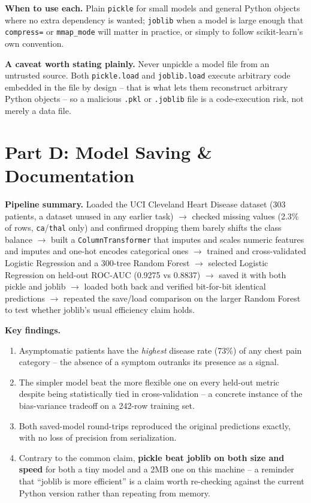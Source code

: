 \documentclass[11pt,a4paper]{article}
\begin{document}
\textbf{When to use each.} Plain \texttt{pickle} for small models and general Python
objects where no extra dependency is wanted; \texttt{joblib} when a model is large
enough that \texttt{compress=} or \texttt{mmap\_mode} will matter in practice, or simply
to follow scikit-learn's own convention.

\textbf{A caveat worth stating plainly.} Never unpickle a model file from an untrusted
source. Both \texttt{pickle.load} and \texttt{joblib.load} execute arbitrary code
embedded in the file by design -- that is what lets them reconstruct arbitrary Python
objects -- so a malicious \texttt{.pkl} or \texttt{.joblib} file is a code-execution
risk, not merely a data file.

\section*{Part D: Model Saving \& Documentation}

\textbf{Pipeline summary.} Loaded the UCI Cleveland Heart Disease dataset (303 patients,
a dataset unused in any earlier task) $\rightarrow$ checked missing values (2.3\% of
rows, \texttt{ca}/\texttt{thal} only) and confirmed dropping them barely shifts the class
balance $\rightarrow$ built a \texttt{ColumnTransformer} that imputes and scales numeric
features and imputes and one-hot encodes categorical ones $\rightarrow$ trained and
cross-validated Logistic Regression and a 300-tree Random Forest $\rightarrow$ selected
Logistic Regression on held-out ROC-AUC (0.9275 vs 0.8837) $\rightarrow$ saved it with
both pickle and joblib $\rightarrow$ loaded both back and verified bit-for-bit identical
predictions $\rightarrow$ repeated the save/load comparison on the larger Random Forest
to test whether joblib's usual efficiency claim holds.

\textbf{Key findings.}
\begin{enumerate}
    \item Asymptomatic patients have the \emph{highest} disease rate (73\%) of any chest
    pain category -- the absence of a symptom outranks its presence as a signal.
    \item The simpler model beat the more flexible one on every held-out metric despite
    being statistically tied in cross-validation -- a concrete instance of the
    bias-variance tradeoff on a 242-row training set.
    \item Both saved-model round-trips reproduced the original predictions exactly, with
    no loss of precision from serialization.
    \item Contrary to the common claim, \textbf{pickle beat joblib on both size and
    speed} for both a tiny model and a 2MB one on this machine -- a reminder that
    ``joblib is more efficient'' is a claim worth re-checking against the current Python
    version rather than repeating from memory.
\end{enumerate}
\end{document}
